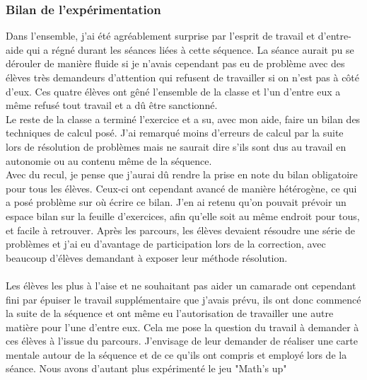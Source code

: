 \subsubsection*{Bilan de l'expérimentation}
Dans l'ensemble, j'ai été agréablement surprise par l'esprit de travail et d'entre-aide qui a régné durant les séances liées à cette séquence. La séance aurait pu se dérouler de manière fluide si je n'avais cependant pas eu de problème avec des élèves très demandeurs d'attention qui refusent de travailler si on n'est pas à côté d'eux. Ces quatre élèves ont gêné l'ensemble de la classe et l'un d'entre eux a même refusé tout travail et a dû être sanctionné.\\
Le reste de la classe a terminé l'exercice et a su, avec mon aide, faire un bilan des techniques de calcul posé. J'ai remarqué moins d'erreurs de calcul par la suite lors de résolution de problèmes mais ne saurait dire s'ils sont dus au travail en autonomie ou au contenu même de la séquence.\\
Avec du recul, je pense que j'aurai dû rendre la prise en note du bilan obligatoire pour tous les élèves. Ceux-ci ont cependant avancé de manière hétérogène, ce qui a posé problème sur où écrire ce bilan. J'en ai retenu qu'on pouvait prévoir un espace bilan sur la feuille d'exercices, afin qu'elle soit au même endroit pour tous, et facile à retrouver. Après les parcours, les élèves devaient résoudre une série de problèmes et j'ai eu d'avantage de participation lors de la correction, avec beaucoup d'élèves demandant à exposer leur méthode résolution.
\paragraph{}Les élèves les plus à l'aise et ne souhaitant pas aider un camarade ont cependant fini par épuiser le travail supplémentaire que j'avais prévu, ils ont donc commencé la suite de la séquence et ont même eu l'autorisation de travailler une autre matière pour l'une d'entre eux. Cela me pose la question du travail à demander à ces élèves à l'issue du parcours. J'envisage de leur demander de réaliser une carte mentale autour de la séquence et de ce qu'ils ont compris et employé lors de la séance. Nous avons d'autant plus expérimenté le jeu "Math's up"%

